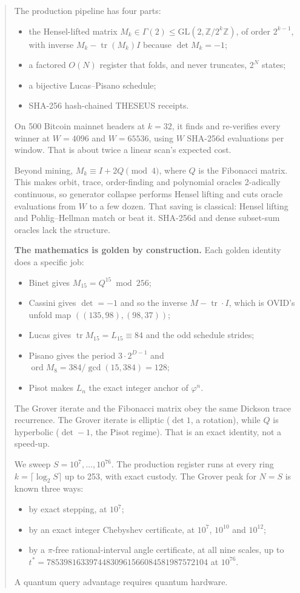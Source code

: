 \documentclass[11pt]{article}
\theoremstyle{definition}
\newcommand{\Z}{\mathbb{Z}}
\newcommand{\GL}{\mathrm{GL}}
\newcommand{\tr}{\operatorname{tr}}
\begin{document}
\begin{abstract}
The production pipeline has four parts:
\begin{itemize}
\item the Hensel-lifted matrix $M_k\in\Gamma(2)\le\GL(2,\Z/2^k\Z)$, of order $2^{k-1}$, with inverse $M_k-\tr(M_k)I$
because $\det M_k=-1$;
\item a factored $O(N)$ register that folds, and never truncates, $2^N$ states;
\item a bijective Lucas--Pisano schedule;
\item SHA-256 hash-chained THESEUS receipts.
\end{itemize}
On 500 Bitcoin mainnet headers at $k=32$, it finds and re-verifies every winner at $W=4096$ and $W=65536$, using $W$
SHA-256d evaluations per window. That is about twice a linear scan's expected cost.

Beyond mining, $M_k\equiv I+2Q\pmod 4$, where $Q$ is the Fibonacci matrix. This makes orbit, trace, order-finding and
polynomial oracles 2-adically continuous, so generator collapse performs Hensel lifting and cuts oracle evaluations
from $W$ to a few dozen. That saving is classical: Hensel lifting and Pohlig--Hellman match or beat it. SHA-256d and
dense subset-sum oracles lack the structure.

\textbf{The mathematics is golden by construction.} Each golden identity does a specific job:
\begin{itemize}
\item Binet gives $M_{15}=Q^{15}\bmod256$;
\item Cassini gives $\det=-1$ and so the inverse $M-\tr\cdot I$, which is OVID's unfold map $((135,98),(98,37))$;
\item Lucas gives $\tr M_{15}=L_{15}\equiv84$ and the odd schedule strides;
\item Pisano gives the period $3\cdot2^{D-1}$ and $\operatorname{ord}M_8=384/\gcd(15,384)=128$;
\item Pisot makes $L_n$ the exact integer anchor of $\varphi^n$.
\end{itemize}
The Grover iterate and the Fibonacci matrix obey the same Dickson trace recurrence. The Grover iterate is elliptic
($\det 1$, a rotation), while $Q$ is hyperbolic ($\det -1$, the Pisot regime). That is an exact identity, not a
speed-up.

We sweep $S=10^7,\dots,10^{76}$. The production register runs at every ring $k=\lceil\log_2S\rceil$ up to 253, with
exact custody. The Grover peak for $N=S$ is known three ways:
\begin{itemize}
\item by exact stepping, at $10^7$;
\item by an exact integer Chebyshev certificate, at $10^7$, $10^{10}$ and $10^{12}$;
\item by a $\pi$-free rational-interval angle certificate, at all nine scales, up to
$t^*=78539816339744830961566084581987572104$ at $10^{76}$.
\end{itemize}
A quantum query advantage requires quantum hardware.
\end{abstract}
\end{document}
